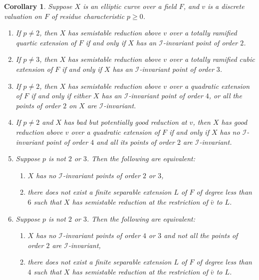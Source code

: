 \documentclass{amsart}
\def\I{{\mathcal I}}
\newtheorem{cor}[thm]{Corollary}
\theoremstyle{definition}
\begin{document}
\begin{cor}
\label{4326cor}
Suppose 
$X$ is an elliptic curve over a field $F$, and 
$v$ is a discrete valuation on $F$ of residue characteristic 
$p \ge 0$. 
\begin{enumerate}
\item[(a)] If $p \ne 2$, 
then $X$ has semistable reduction above $v$ over a 
totally ramified quartic extension of $F$  
if and only if 
$X$ has an $\I$-invariant point of order $2$.
\item[(b)] If $p \ne 3$, 
then $X$ has semistable reduction above $v$ over a totally ramified  
cubic extension of $F$  
if and only if $X$ has an $\I$-invariant point of order $3$.
\item[(c)] 
If $p \ne 2$,
then $X$ has semistable reduction above $v$ over a quadratic 
extension of $F$ if and only if 
either $X$ has an $\I$-invariant point of order $4$,
or all the points of order $2$ on $X$ are $\I$-invariant.
\item[(d)] 
If $p \ne 2$ and $X$ has bad but potentially good reduction
at $v$,
then $X$ has good reduction above $v$ over a quadratic 
extension of $F$ if and only if 
$X$ has no $\I$-invariant point of order $4$ 
and all its points of order $2$ are $\I$-invariant.
\item[(e)] Suppose $p$ is not $2$ or $3$. Then the following
are equivalent:
\begin{enumerate} 
\item[(i)]  $X$ has no $\I$-invariant points of order $2$ or $3$, 
\item[(ii)] there does not exist a finite separable extension $L$
of $F$ of degree less than $6$ 
such that $X$ has semistable reduction at the restriction of 
${\bar v}$ to $L$.
\end{enumerate}
\item[(f)] Suppose $p$ is not $2$ or $3$. Then the following
are equivalent:
\begin{enumerate} 
\item[(i)]  $X$ has no $\I$-invariant points of order $4$ or $3$
and not all the points of order $2$ are $\I$-invariant, 
\item[(ii)] there does not exist a finite separable extension $L$
of $F$ of degree less than $4$ 
such that $X$ has semistable reduction at the restriction 
of ${\bar v}$ to $L$.
\end{enumerate}
\end{enumerate}
\end{cor}
\end{document}
